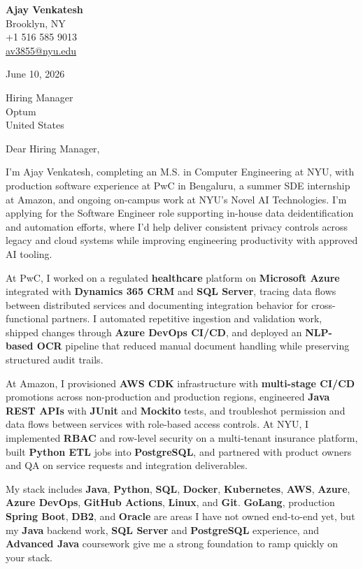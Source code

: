 \documentclass[letterpaper,11pt]{article}
\begin{document}
\begin{flushleft}
\textbf{\large Ajay Venkatesh} \\
Brooklyn, NY \\
+1 516 585 9013 \\
\href{mailto:av3855@nyu.edu}{av3855@nyu.edu}
\end{flushleft}
\vspace{10pt}
June 10, 2026
\vspace{6pt}

Hiring Manager \\
Optum \\
United States

\vspace{10pt}

Dear Hiring Manager,

I'm Ajay Venkatesh, completing an M.S. in Computer Engineering at NYU, with production software experience at PwC in Bengaluru, a summer SDE internship at Amazon, and ongoing on-campus work at NYU's Novel AI Technologies. I'm applying for the Software Engineer role supporting in-house data deidentification and automation efforts, where I'd help deliver consistent privacy controls across legacy and cloud systems while improving engineering productivity with approved AI tooling.

At PwC, I worked on a regulated \textbf{healthcare} platform on \textbf{Microsoft Azure} integrated with \textbf{Dynamics 365 CRM} and \textbf{SQL Server}, tracing data flows between distributed services and documenting integration behavior for cross-functional partners. I automated repetitive ingestion and validation work, shipped changes through \textbf{Azure DevOps CI/CD}, and deployed an \textbf{NLP-based OCR} pipeline that reduced manual document handling while preserving structured audit trails.

At Amazon, I provisioned \textbf{AWS CDK} infrastructure with \textbf{multi-stage CI/CD} promotions across non-production and production regions, engineered \textbf{Java REST APIs} with \textbf{JUnit} and \textbf{Mockito} tests, and troubleshot permission and data flows between services with role-based access controls. At NYU, I implemented \textbf{RBAC} and row-level security on a multi-tenant insurance platform, built \textbf{Python ETL} jobs into \textbf{PostgreSQL}, and partnered with product owners and QA on service requests and integration deliverables.

My stack includes \textbf{Java}, \textbf{Python}, \textbf{SQL}, \textbf{Docker}, \textbf{Kubernetes}, \textbf{AWS}, \textbf{Azure}, \textbf{Azure DevOps}, \textbf{GitHub Actions}, \textbf{Linux}, and \textbf{Git}. \textbf{GoLang}, production \textbf{Spring Boot}, \textbf{DB2}, and \textbf{Oracle} are areas I have not owned end-to-end yet, but my \textbf{Java} backend work, \textbf{SQL Server} and \textbf{PostgreSQL} experience, and \textbf{Advanced Java} coursework give me a strong foundation to ramp quickly on your stack.
\end{document}
